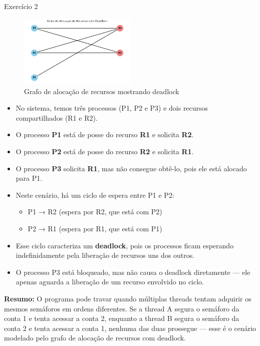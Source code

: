 \documentclass[14pt,a4paper]{article}
\begin{document}
\begin{solucao}{Exercício 2}{}
\begin{figure}[H]
    \centering
    \includegraphics[width=0.5\textwidth]{grafo.png}
    \caption{Grafo de alocação de recursos mostrando deadlock}
    \label{fig:grafo}
\end{figure}

\begin{itemize}
    \item No sistema, temos três processos (P1, P2 e P3) e dois recursos compartilhados (R1 e R2).
    \item O processo \textbf{P1} está de posse do recurso \textbf{R1} e solicita \textbf{R2}.
    \item O processo \textbf{P2} está de posse do recurso \textbf{R2} e solicita \textbf{R1}.
    \item O processo \textbf{P3} solicita \textbf{R1}, mas não consegue obtê-lo, pois ele está alocado para P1.
    \item Neste cenário, há um ciclo de espera entre P1 e P2:
    \begin{itemize}
        \item P1 → R2 (espera por R2, que está com P2)
        \item P2 → R1 (espera por R1, que está com P1)
    \end{itemize}
    \item Esse ciclo caracteriza um \textbf{deadlock}, pois os processos ficam esperando indefinidamente pela liberação de recursos uns dos outros.
    \item O processo P3 está bloqueado, mas não causa o deadlock diretamente — ele apenas aguarda a liberação de um recurso envolvido no ciclo.
\end{itemize}

\textbf{Resumo:} O programa pode travar quando múltiplas threads tentam adquirir os mesmos semáforos em ordens diferentes. Se a thread A segura o semáforo da conta 1 e tenta acessar a conta 2, enquanto a thread B segura o semáforo da conta 2 e tenta acessar a conta 1, nenhuma das duas prossegue — esse é o cenário modelado pelo grafo de alocação de recursos com deadlock.

\end{solucao}
\end{document}
